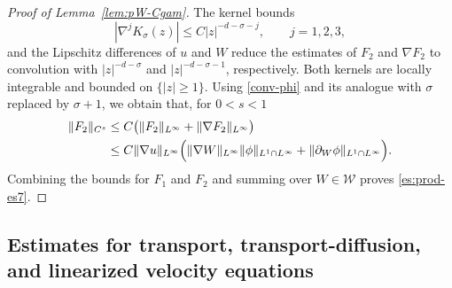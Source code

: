 \documentclass[reqno,11pt,a4paper]{amsart}
\begin{document}
\begin{proof}[Proof of Lemma~\ref{lem:pW-Cgam}]
The kernel bounds
\[
  |\nabla^jK_\sigma(z)|
  \leq C|z|^{-d-\sigma-j},
  \qquad j=1,2,3,
\]
and the Lipschitz differences of $u$ and $W$
reduce the estimates of $F_2$ and $\nabla F_2$
to convolution with
$|z|^{-d-\sigma}$ and $|z|^{-d-\sigma-1}$,
respectively.
Both kernels are locally integrable and bounded
on $\{|z|\geq1\}$.
Using \eqref{conv-phi} and its analogue
with $\sigma$ replaced by $\sigma+1$, we obtain that, for $0<s<1$
\begin{align*}
  \Vert F_2\Vert _{C^s}
  &\leq
  C\bigl(\Vert F_2\Vert _{L^\infty}
       +\Vert \nabla F_2\Vert _{L^\infty}\bigr)
  \\
  &\leq
  C\Vert \nabla u\Vert _{L^\infty}
  \Bigl(
    \Vert \nabla W\Vert _{L^\infty}
    \Vert \phi\Vert _{L^1\cap L^\infty}
    +
    \Vert \partial_W\phi\Vert _{L^1\cap L^\infty}
  \Bigr).
\end{align*}
Combining the bounds for $F_1$ and $F_2$
and summing over $W\in\mathcal W$
proves \eqref{es:prod-es7}.
\end{proof}



\subsection{Estimates for transport, transport-diffusion,
and linearized velocity equations}
\label{subsec:evolution-estimates}
\end{document}
